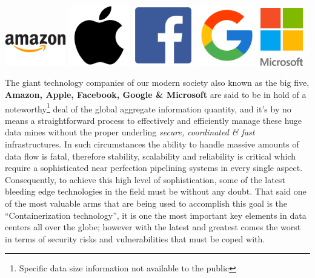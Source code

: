 \documentclass[
  14pt,
  english,
  a4paper,
]{scrreprt}
\begin{document}
\leavevmode\hypertarget{bigfive}{}%
\includegraphics[width=0.2\textwidth,height=\textheight]{figures/Amazon-logo.png}
\includegraphics[width=0.2\textwidth,height=\textheight]{figures/Apple_logo.png}
\includegraphics[width=0.2\textwidth,height=\textheight]{figures/Facebook-logo.png}
\includegraphics[width=0.2\textwidth,height=\textheight]{figures/Google-logo.png}
\includegraphics[width=0.14\textwidth,height=\textheight]{figures/Microsoft-logo.png}

The giant technology companies of our modern society also known as the
big five, \textbf{Amazon, Apple, Facebook, Google \& Microsoft} are said
to be in hold of a noteworthy\footnote{Specific data size information
  not available to the public} deal of the global aggregate information
quantity, and it's by no means a straightforward process to effectively
and efficiently manage these huge data mines without the proper
underling \emph{secure, coordinated \& fast} infrastructures. In such
circumstances the ability to handle massive amounts of data flow is
fatal, therefore stability, scalability and reliability is critical
which require a sophisticated near perfection pipelining systems in
every single aspect. Consequently, to achieve this high level of
sophistication, some of the latest bleeding edge technologies in the
field must be without any doubt. That said one of the most valuable arms
that are being used to accomplish this goal is the ``Containerization
technology'', it is one the most important key elements in data centers
all over the globe; however with the latest and greatest comes the worst
in terms of security risks and vulnerabilities that must be coped with.
\end{document}
